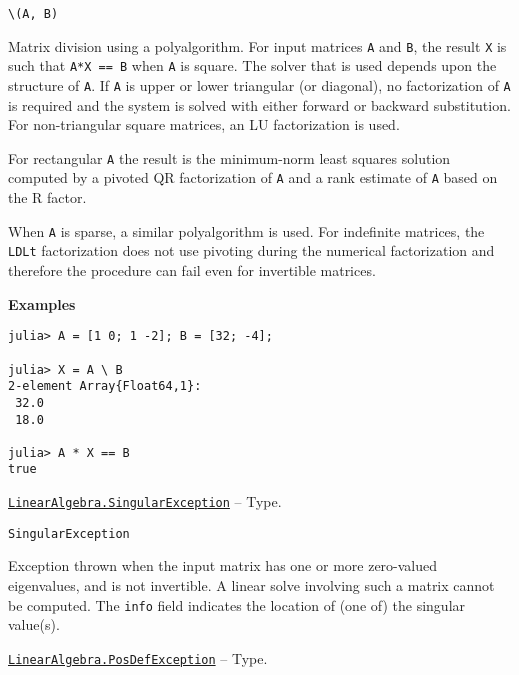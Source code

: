 \begin{adjustwidth}{2em}{0pt}


\begin{verbatim}
\(A, B)
\end{verbatim}

Matrix division using a polyalgorithm. For input matrices \texttt{A} and \texttt{B}, the result \texttt{X} is such that \texttt{A*X == B} when \texttt{A} is square. The solver that is used depends upon the structure of \texttt{A}.  If \texttt{A} is upper or lower triangular (or diagonal), no factorization of \texttt{A} is required and the system is solved with either forward or backward substitution. For non-triangular square matrices, an LU factorization is used.

For rectangular \texttt{A} the result is the minimum-norm least squares solution computed by a pivoted QR factorization of \texttt{A} and a rank estimate of \texttt{A} based on the R factor.

When \texttt{A} is sparse, a similar polyalgorithm is used. For indefinite matrices, the \texttt{LDLt} factorization does not use pivoting during the numerical factorization and therefore the procedure can fail even for invertible matrices.

\textbf{Examples}


\begin{verbatim}
julia> A = [1 0; 1 -2]; B = [32; -4];

julia> X = A \ B
2-element Array{Float64,1}:
 32.0
 18.0

julia> A * X == B
true
\end{verbatim}



\end{adjustwidth}
\hypertarget{3093579424646561023}{} 
\hyperlink{3093579424646561023}{\texttt{LinearAlgebra.SingularException}}  -- {Type.}

\begin{adjustwidth}{2em}{0pt}


\begin{verbatim}
SingularException
\end{verbatim}

Exception thrown when the input matrix has one or more zero-valued eigenvalues, and is not invertible. A linear solve involving such a matrix cannot be computed. The \texttt{info} field indicates the location of (one of) the singular value(s).



\end{adjustwidth}
\hypertarget{12039872206324733514}{} 
\hyperlink{12039872206324733514}{\texttt{LinearAlgebra.PosDefException}}  -- {Type.}

